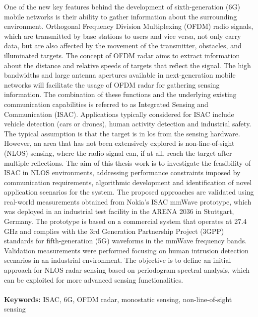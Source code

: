 \documentclass{Configuration_Files/PoliMi3i_thesis}
\begin{document}
One of the new key features behind the development of sixth-generation (6G) mobile networks is their ability to gather information about the surrounding environment. 
Orthogonal Frequency Division Multiplexing (OFDM) radio signals, which are transmitted by base stations to users and vice versa, not only carry data, but are also affected by the movement of the transmitter, obstacles, and illuminated targets.
The concept of OFDM radar aims to extract information about the distance and relative speeds of targets that reflect the signal.
The high bandwidths and large antenna apertures available in next-generation mobile networks will facilitate the usage of OFDM radar for gathering sensing information. 
The combination of these functions and the underlying existing communication capabilities is referred to as Integrated Sensing and Communication (ISAC).
Applications typically considered for ISAC include vehicle detection (cars or drones), human activity detection and industrial safety. 
The typical assumption is that the target is in \gls{los} from the sensing hardware. 
However, an area that has not been extensively explored is non-line-of-sight (NLOS) sensing, where the radio signal can, if at all, reach the target after multiple reflections.
The aim of this thesis work is to investigate the feasibility of ISAC in NLOS environments, addressing performance constraints imposed by communication requirements, algorithmic development and identification of novel application scenarios for the system.
The proposed approaches are validated using real-world measurements obtained from Nokia's ISAC mmWave prototype, which was deployed in an industrial test facility in the ARENA 2036 in Stuttgart, Germany.
The prototype is based on a commercial system that operates at 27.4 GHz and complies with the 3rd Generation Partnership Project (3GPP) standards for fifth-generation (5G) waveforms in the mmWave frequency bands. 
Validation measurements were performed focusing on human intrusion detection scenarios in an industrial environment.
The objective is to define an initial approach for NLOS radar sensing based on periodogram spectral analysis, which can be exploited for more advanced sensing functionalities.
\\
\\
\textbf{Keywords:} ISAC, 6G, OFDM radar, monostatic sensing, non-line-of-sight sensing %
\end{document}
